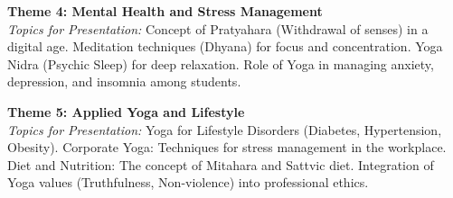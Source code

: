 \vspace{0.3cm}

\noindent\textbf{Theme 4: Mental Health and Stress Management} \\
\textit{Topics for Presentation:} Concept of Pratyahara (Withdrawal of senses) in a digital age. Meditation techniques (Dhyana) for focus and concentration. Yoga Nidra (Psychic Sleep) for deep relaxation. Role of Yoga in managing anxiety, depression, and insomnia among students.

\vspace{0.3cm}

\noindent\textbf{Theme 5: Applied Yoga and Lifestyle} \\
\textit{Topics for Presentation:} Yoga for Lifestyle Disorders (Diabetes, Hypertension, Obesity). Corporate Yoga: Techniques for stress management in the workplace. Diet and Nutrition: The concept of Mitahara and Sattvic diet. Integration of Yoga values (Truthfulness, Non-violence) into professional ethics.

\newpage
{}